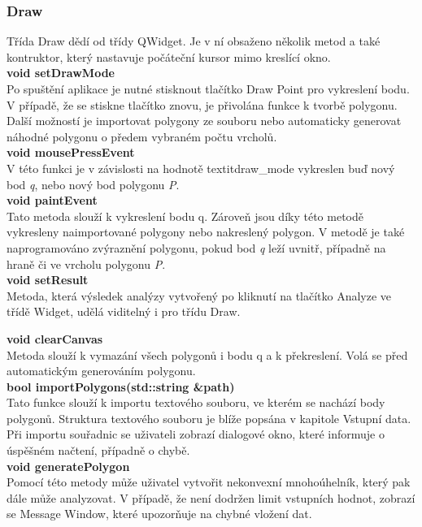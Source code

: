 \documentclass[a4paper,11pt,twoside]{article}
\begin{document}
\newpage
\vspace*{-1cm}
\subsubsection{Draw}
Třída Draw dědí od třídy QWidget. Je v ní obsaženo několik metod a také kontruktor, který nastavuje počáteční kursor mimo kreslící okno.\\

\noindent\textbf{void setDrawMode}\\
Po spuštění aplikace je nutné stisknout tlačítko Draw Point pro vykreslení bodu. V případě, že se stiskne tlačítko znovu, je přivolána funkce k tvorbě polygonu. Další možností je importovat polygony ze souboru nebo automaticky generovat náhodné polygonu o předem vybraném počtu vrcholů.\\

\noindent\textbf{void mousePressEvent}\\
V této funkci je v závislosti na hodnotě textit{draw\_mode} vykreslen buď nový bod \textit{q}, nebo nový bod polygonu \textit{P}.\\

\noindent\textbf{void paintEvent}\\
Tato metoda slouží k vykreslení bodu q. Zároveň jsou díky této metodě vykresleny naimportované polygony nebo nakreslený polygon. V metodě je také naprogramováno zvýraznění polygonu, pokud bod \textit{q} leží uvnitř, případně na hraně či ve vrcholu polygonu \textit{P}.\\

\noindent\textbf{void setResult}\\
Metoda, která výsledek analýzy vytvořený po kliknutí na tlačítko Analyze ve třídě Widget, udělá viditelný i pro třídu Draw.

\noindent\textbf{void clearCanvas}\\
Metoda slouží k vymazání všech polygonů i bodu q a k překreslení. Volá se před automatickým generováním polygonu. \\

\noindent\textbf{bool importPolygons(std::string \&path)}\\
Tato funkce slouží k importu textového souboru, ve kterém se nachází body polygonů. Struktura textového souboru je blíže popsána v kapitole Vstupní data. Při importu souřadnic se uživateli zobrazí dialogové okno, které informuje o úspěšném načtení, případně o chybě.\\

\newpage
\vspace*{-1cm}
\noindent\textbf{void generatePolygon}\\
Pomocí této metody může uživatel vytvořit nekonvexní mnohoúhelník, který pak dále může analyzovat. V případě, že není dodržen limit vstupních hodnot, zobrazí se Message Window, které upozorňuje na chybné vložení dat.\\
\end{document}
